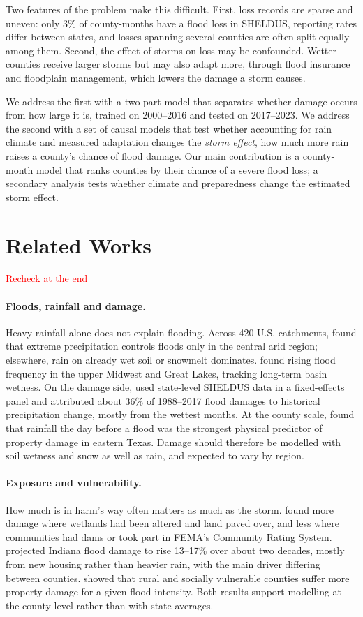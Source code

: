 \documentclass[10pt,twocolumn]{article}
\begin{document}
Two features of the problem make this difficult. First, loss records are sparse and uneven:
only 3\% of county-months have a flood loss in SHELDUS, reporting rates differ between states,
and losses spanning several counties are often split equally among them. Second, the effect of
storms on loss may be confounded. Wetter counties receive larger storms but may also adapt more,
through flood insurance and floodplain management, which lowers the damage a storm causes.

We address the first with a two-part model that separates whether damage occurs from how large
it is, trained on 2000--2016 and tested on 2017--2023. We address the second with a set of
causal models that test whether accounting for rain climate and measured adaptation changes the
\emph{storm effect}, how much more rain raises a county's chance of flood damage. Our main
contribution is a county-month model that ranks counties by their chance of a severe flood loss;
a secondary analysis tests whether climate and preparedness change the estimated storm effect.


\section{Related Works}
\textcolor{red}{Recheck at the end}

\paragraph{Floods, rainfall and damage.}
Heavy rainfall alone does not explain flooding. Across 420 U.S. catchments,
\citet{berghuijs2016} found that extreme precipitation controls floods only in the central arid region; elsewhere, rain on already wet soil or snowmelt dominates. \citet{slater2016} found rising flood frequency in the upper Midwest and Great Lakes, tracking long-term basin wetness. On the damage side, \citet{davenport2021} used state-level SHELDUS data in a fixed-effects panel and attributed about 36\% of 1988--2017 flood damages to historical precipitation change, mostly from the wettest months. At the county scale, \citet{brody2008} found that rainfall the day before a flood was the strongest physical predictor of property damage in eastern Texas. Damage should therefore be modelled with soil wetness and snow as well as rain, and expected to vary by region.

\paragraph{Exposure and vulnerability.}
How much is in harm's way often matters as much as the storm. \citet{brody2008} found more damage where wetlands had been altered and land paved over, and less where communities had dams or took part in FEMA's Community Rating System. \citet{liu2015} projected Indiana flood damage to rise 13--17\% over about two decades, mostly from new housing rather than heavier rain, with the main driver differing between counties. \citet{tellman2020} showed that rural and socially vulnerable counties suffer more property damage for a given flood intensity. Both results support modelling at the county level rather than with state averages.
\end{document}
